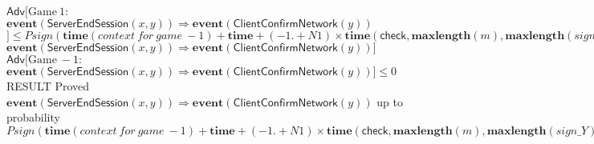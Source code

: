 \documentclass{article}
\newcommand{\kw}[1]{\mathbf{#1}}
\newcommand{\kwf}[1]{\mathsf{#1}}
\newcommand{\var}[1]{\mathit{#1}}
\newcommand{\kwt}[1]{\mathit{#1}}
\newcommand{\kwp}[1]{\mathit{#1}}
\begin{document}
$\mathsf{Adv}[\mathrm{Game}\ 1: $$\kw{event}(\kwf{ServerEndSession}(\var{x}, \var{y})) \Longrightarrow \kw{event}(\kwf{ClientConfirmNetwork}(\var{y}))$$] \leq \var{Psign}(\kw{time}(\mathit{context\ for\ game}\ -1) + \kw{time} + (-1. + \kwp{N1}) \times \kw{time}(\kwf{check}, \kw{maxlength}(\var{m}), \allowbreak \kw{maxlength}(\var{sign{\_}Y})), \allowbreak \kwp{N1}, \allowbreak \kw{maxlength}(\var{m}_{3})) + 2. / |\kwt{hmac{\_}key}| + \var{Psigncoll} + \var{Psign}(\kw{time}(\mathit{context\ for\ game}\ -1) + \kw{time} + (-1. + 2. \times \kwp{N1}) \times \kw{time}(\kwf{check}, \kw{max}(\kw{length}((\kwt{hmac{\_}key}, \kwt{G}, \kwt{bitstring}), \allowbreak \kw{length}(\kwf{hash}, \allowbreak \kw{length}(\kwf{G2bit}))), \allowbreak \kw{length}((\kwt{hmac{\_}key}, \kwt{bitstring}, \kwt{G}, \kwt{bitstring}), \allowbreak \kw{maxlength}(\var{sign{\_}A}), \allowbreak \kw{length}(\kwf{hash}, \allowbreak \kw{length}(\kwf{G2bit})))), \allowbreak \kw{max}(\kw{maxlength}(\var{sign{\_}Y}), \allowbreak \kw{maxlength}(\var{sign{\_}B}))), \allowbreak \kwp{N1}, \allowbreak \kw{maxlength}(\var{m}_{4})) + \mathsf{Adv}[\mathrm{Game}\ -1: $$\kw{event}(\kwf{ServerEndSession}(\var{x}, \var{y})) \Longrightarrow \kw{event}(\kwf{ClientConfirmNetwork}(\var{y}))$$]$\\
$\mathsf{Adv}[\mathrm{Game}\ -1: $$\kw{event}(\kwf{ServerEndSession}(\var{x}, \var{y})) \Longrightarrow \kw{event}(\kwf{ClientConfirmNetwork}(\var{y}))$$] \leq 0$\\
RESULT Proved $\kw{event}(\kwf{ServerEndSession}(\var{x}, \var{y})) \Longrightarrow \kw{event}(\kwf{ClientConfirmNetwork}(\var{y}))$ up to probability $\var{Psign}(\kw{time}(\mathit{context\ for\ game}\ -1) + \kw{time} + (-1. + \kwp{N1}) \times \kw{time}(\kwf{check}, \kw{maxlength}(\var{m}), \allowbreak \kw{maxlength}(\var{sign{\_}Y})), \allowbreak \kwp{N1}, \allowbreak \kw{maxlength}(\var{m}_{3})) + 2. / |\kwt{hmac{\_}key}| + \var{Psigncoll} + \var{Psign}(\kw{time}(\mathit{context\ for\ game}\ -1) + \kw{time} + (-1. + 2. \times \kwp{N1}) \times \kw{time}(\kwf{check}, \kw{max}(\kw{length}((\kwt{hmac{\_}key}, \kwt{G}, \kwt{bitstring}), \allowbreak \kw{length}(\kwf{hash}, \allowbreak \kw{length}(\kwf{G2bit}))), \allowbreak \kw{length}((\kwt{hmac{\_}key}, \kwt{bitstring}, \kwt{G}, \kwt{bitstring}), \allowbreak \kw{maxlength}(\var{sign{\_}A}), \allowbreak \kw{length}(\kwf{hash}, \allowbreak \kw{length}(\kwf{G2bit})))), \allowbreak \kw{max}(\kw{maxlength}(\var{sign{\_}Y}), \allowbreak \kw{maxlength}(\var{sign{\_}B}))), \allowbreak \kwp{N1}, \allowbreak \kw{maxlength}(\var{m}_{4}))$\\
\end{document}
